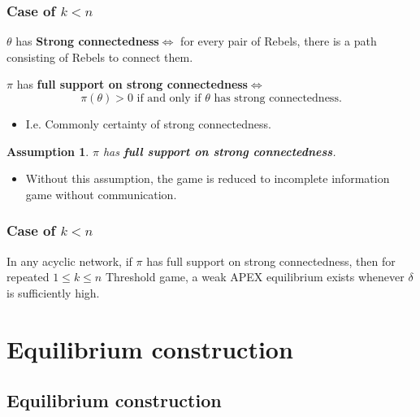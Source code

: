 \documentclass[9pt]{beamer}
\newtheorem{assumption}{Assumption}[section]
\begin{document}
\begin{frame}
  \frametitle{Case of $k<n$}


\begin{definition}
$\theta$ has \textbf{Strong connectedness}$\Leftrightarrow$ for every pair of Rebels, there is a path consisting of Rebels to connect them.
\end{definition}  

\begin{definition}
$\pi$ has \textbf{full support on strong connectedness}$\Leftrightarrow$ 
\[\text{$\pi(\theta)>0$ if and only if $\theta$ has strong connectedness.}\]
\end{definition}  
\begin{itemize}
\item I.e. Commonly certainty of strong connectedness.
\end{itemize}
\pause
\begin{assumption}
$\pi$ has \textbf{full support on strong connectedness}.
\end{assumption}
\begin{itemize}
\item Without this assumption, the game is reduced to incomplete information game without communication. 
\end{itemize}
\end{frame}





\begin{frame}
  \frametitle{Case of $k<n$}



\begin{theorem}[$k\leq n$]
\label{thm_main_result}
In any \alert{acyclic} network, if $\pi$ has full support  {on strong connectedness}, then for repeated $1\leq k \leq n$ Threshold game, a {weak} APEX equilibrium {exists} whenever $\delta$ is sufficiently high.
\end{theorem}


\end{frame}

\section{Equilibrium construction}
\subsection{Equilibrium construction}
\end{document}

